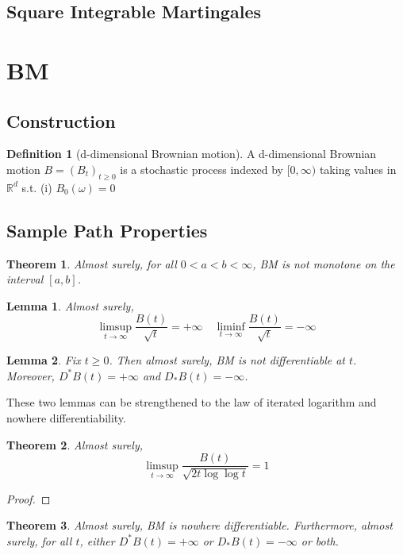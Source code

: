 \documentclass{article}
\newtheorem{Thm}{Theorem}[section]
\newtheorem{Lem}{Lemma}[section]
\theoremstyle{definition}
\newtheorem{Def}{Definition}[section]
\renewcommand{\geq}{\geqslant}
\newcommand{\<}{\left\langle}
\renewcommand{\>}{\right\rangle}
\begin{document}
\subsection{Square Integrable Martingales}




\section{BM}
\subsection{Construction}
\begin{Def}[d-dimensional Brownian motion]
    A d-dimensional Brownian motion $B=(B_t)_{t\geq 0}$ is a stochastic process indexed by $[0,\infty)$ taking values in $\mathbb{R}^d$ s.t. \newline 
    (i) $B_0(\omega)=0$

\end{Def}

\subsection{Sample Path Properties}
\begin{Thm}
    Almost surely, for all $0<a<b<\infty$, BM is not monotone on the interval $[a,b]$.
\end{Thm}

\begin{Lem}
    Almost surely, 
    \[\limsup_{t\to\infty}\frac{B(t)}{\sqrt{t}}=+\infty\quad \liminf_{t\to\infty}\frac{B(t)}{\sqrt{t}}=-\infty\]
\end{Lem}

\begin{Lem}
    Fix $t\geq 0$. Then almost surely, BM is not differentiable at $t$. 
    Moreover, $D^*B(t)=+\infty$ and $D_*B(t)=-\infty$.
\end{Lem}

These two lemmas can be strengthened to the law of iterated logarithm and nowhere differentiability.
\begin{Thm}
    Almost surely,
    \[\limsup_{t\to\infty}\frac{B(t)}{\sqrt{2t\log\log t}}=1\]
\end{Thm}
\begin{proof}
    
\end{proof}

\begin{Thm}
    Almost surely, BM is nowhere differentiable. Furthermore, almost surely, for all $t$,
    either $D^*B(t)=+\infty$ or $D_*B(t)=-\infty$ or both.
\end{Thm}
\end{document}
